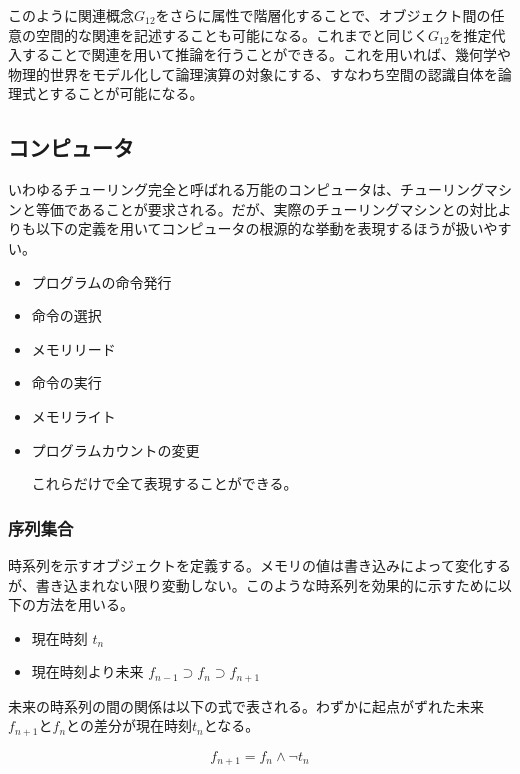 \documentclass[12pt]{article}
\begin{document}
このように関連概念\(G_{12}\)をさらに属性で階層化することで、オブジェクト間の任意の空間的な関連を記述することも可能になる。これまでと同じく\(G_{12}\)を推定代入することで関連を用いて推論を行うことができる。これを用いれば、幾何学や物理的世界をモデル化して論理演算の対象にする、すなわち空間の認識自体を論理式とすることが可能になる。

\subsection{コンピュータ}\label{ux30b3ux30f3ux30d4ux30e5ux30fcux30bf}

いわゆるチューリング完全と呼ばれる万能のコンピュータは、チューリングマシンと等価であることが要求される。だが、実際のチューリングマシンとの対比よりも以下の定義を用いてコンピュータの根源的な挙動を表現するほうが扱いやすい。

\begin{itemize}
\item
  プログラムの命令発行
\item
  命令の選択
\item
  メモリリード
\item
  命令の実行
\item
  メモリライト
\item
  プログラムカウントの変更

  これらだけで全て表現することができる。
\end{itemize}

\subsubsection{序列集合}\label{ux5e8fux5217ux96c6ux5408}

時系列を示すオブジェクトを定義する。メモリの値は書き込みによって変化するが、書き込まれない限り変動しない。このような時系列を効果的に示すために以下の方法を用いる。

\begin{itemize}

\item
  現在時刻 \(t_n\)
\item
  現在時刻より未来 \(f_{n-1} \supset f_n \supset f_{n+1}\)
\end{itemize}

未来の時系列の間の関係は以下の式で表される。わずかに起点がずれた未来\(f_{n+1}\)と\(f_n\)との差分が現在時刻\(t_n\)となる。

\begin{equation}f_{n+1}=f_{n}\wedge \neg t_n\end{equation}
\end{document}
